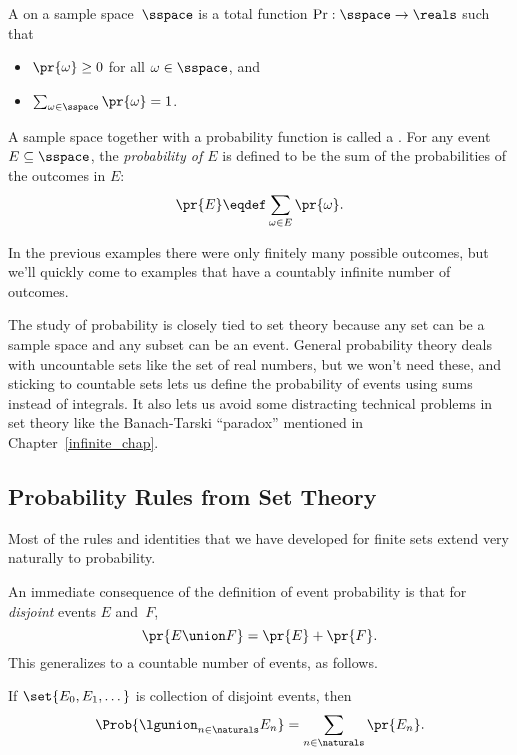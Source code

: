 \begin{definition}\label{LN12:probsp}
 A  on a sample space~$\sspace$ is a total
 function $\operatorname{Pr}: \sspace\to \reals$ such that
\begin{itemize}
\item $\pr{\omega} \geq 0$ for all $\omega \in \sspace$, and
\item $\sum_{\omega \in \sspace} \pr{\omega} = 1$.
\end{itemize}
A sample space together with a probability function is called a
.
For any event $E \subseteq \sspace$, the 
\emph{probability of $E$} is defined to be the sum of the probabilities of
the outcomes in $E$:
\[
    \pr{E} \eqdef \sum_{\omega \in E} \pr{\omega}.
\]
\end{definition}

In the previous examples there were only finitely many possible
outcomes, but we'll quickly come to examples that have a countably
infinite number of outcomes.

The study of probability is closely tied to set theory
because any set can be a sample space and any subset can be an event.
General probability theory deals with uncountable sets like the set of
real numbers, but we won't need these, and sticking to countable
sets lets us define the probability of events using sums instead of
integrals.  It also lets us avoid some distracting technical problems
in set theory like the Banach-Tarski ``paradox'' mentioned in
Chapter~\ref{infinite_chap}.

\subsection{Probability Rules from Set Theory}\label{sec:union_bound}

Most of the rules and identities that we have developed for finite
sets extend very naturally to probability.  

\iffalse We'll cover several examples in this section, but first let's
review some definitions that should already be familiar.\fi

An immediate consequence of the definition of event probability is
that for \emph{disjoint} events $E$ and~$F$,
\[
    \pr{E \union F} = \pr{E} + \pr{F}.
\]
This generalizes to a countable number of events, as follows.

\begin{rul}
  If $\set{E_0,E_1,\dots}$ is collection of disjoint
  events, then
\[
    \Prob{\lgunion_{n\in\naturals}E_n} = \sum_{n\in\naturals} \pr{E_n}.
\]
\end{rul}

